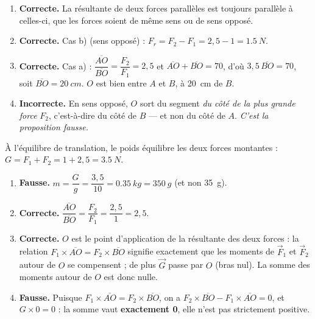 \documentclass[11pt,a4paper]{article}
\newcommand{\vv}[1]{\vec{#1}}\newcommand{\ds}{\displaystyle}
\begin{document}
\begin{corrige}
\begin{enumerate}[label=\alph*)]
  \item \textbf{Correcte.} La résultante de deux forces parallèles est toujours parallèle à
        celles-ci, que les forces soient de même sens ou de sens opposé.
  \item \textbf{Correcte.} Cas b) (sens opposé) : $F_r = F_2 - F_1 = 2{,}5 - 1 = \qty{1.5}{N}$.
  \item \textbf{Correcte.} Cas a) : $\dfrac{\overline{AO}}{\overline{BO}}=\dfrac{F_2}{F_1}=2{,}5$ et
        $\overline{AO}+\overline{BO}=70$, d'où $3{,}5\,\overline{BO}=70$, soit $\overline{BO}=\qty{20}{cm}$.
        $O$ est bien entre $A$ et $B$, à \qty{20}{cm} de $B$.
  \item \textbf{Incorrecte.} En sens opposé, $O$ sort du segment \emph{du côté de la plus grande
        force} $F_2$, c'est-à-dire du côté de $B$ — et non du côté de $A$. \emph{C'est la proposition
        fausse.}
\end{enumerate}
\end{corrige}

\begin{corrige}
À l'équilibre de translation, le poids équilibre les deux forces montantes :
$G = F_1+F_2 = 1+2{,}5 = \qty{3.5}{N}$.
\begin{enumerate}[label=\alph*)]
  \item \textbf{Fausse.} $m = \dfrac{G}{g} = \dfrac{3{,}5}{10} = \qty{0.35}{kg} = \qty{350}{g}$
        (et non \qty{35}{g}).
  \item \textbf{Correcte.} $\dfrac{\overline{AO}}{\overline{BO}}=\dfrac{F_2}{F_1}=\dfrac{2{,}5}{1}=2{,}5$.
  \item \textbf{Correcte.} $O$ est le point d'application de la résultante des deux forces : la relation
        $F_1\times\overline{AO}=F_2\times\overline{BO}$ signifie exactement que les moments de $\vv F_1$
        et $\vv F_2$ autour de $O$ se compensent ; de plus $\vv G$ passe par $O$ (bras nul). La somme
        des moments autour de $O$ est donc nulle.
  \item \textbf{Fausse.} Puisque $F_1\times\overline{AO}=F_2\times\overline{BO}$, on a
        $F_2\times\overline{BO}-F_1\times\overline{AO}=0$, et $G\times 0 = 0$ : la somme vaut
        \textbf{exactement 0}, elle n'est pas strictement positive.
\end{enumerate}
\end{corrige}
\end{document}
